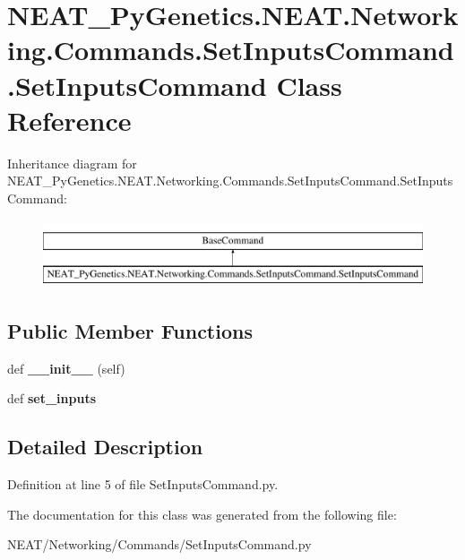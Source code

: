\hypertarget{class_n_e_a_t___py_genetics_1_1_n_e_a_t_1_1_networking_1_1_commands_1_1_set_inputs_command_1_1_set_inputs_command}{}\section{N\+E\+A\+T\+\_\+\+Py\+Genetics.\+N\+E\+A\+T.\+Networking.\+Commands.\+Set\+Inputs\+Command.\+Set\+Inputs\+Command Class Reference}
\label{class_n_e_a_t___py_genetics_1_1_n_e_a_t_1_1_networking_1_1_commands_1_1_set_inputs_command_1_1_set_inputs_command}
Inheritance diagram for N\+E\+A\+T\+\_\+\+Py\+Genetics.\+N\+E\+A\+T.\+Networking.\+Commands.\+Set\+Inputs\+Command.\+Set\+Inputs\+Command\+:\begin{figure}[H]
\begin{center}
\leavevmode
\includegraphics[height=2.000000cm]{class_n_e_a_t___py_genetics_1_1_n_e_a_t_1_1_networking_1_1_commands_1_1_set_inputs_command_1_1_set_inputs_command}
\end{center}
\end{figure}
\subsection*{Public Member Functions}
\begin{DoxyCompactItemize}
\item 
def {\bfseries \+\_\+\+\_\+init\+\_\+\+\_\+} (self)\hypertarget{class_n_e_a_t___py_genetics_1_1_n_e_a_t_1_1_networking_1_1_commands_1_1_set_inputs_command_1_1_set_inputs_command_a8976dadea27ff8c738c32b2a8c42acde}{}\label{class_n_e_a_t___py_genetics_1_1_n_e_a_t_1_1_networking_1_1_commands_1_1_set_inputs_command_1_1_set_inputs_command_a8976dadea27ff8c738c32b2a8c42acde}

\item 
def {\bfseries set\+\_\+inputs}\hypertarget{class_n_e_a_t___py_genetics_1_1_n_e_a_t_1_1_networking_1_1_commands_1_1_set_inputs_command_1_1_set_inputs_command_a610420d005c225778fa1be622cd3843a}{}\label{class_n_e_a_t___py_genetics_1_1_n_e_a_t_1_1_networking_1_1_commands_1_1_set_inputs_command_1_1_set_inputs_command_a610420d005c225778fa1be622cd3843a}

\end{DoxyCompactItemize}


\subsection{Detailed Description}


Definition at line 5 of file Set\+Inputs\+Command.\+py.



The documentation for this class was generated from the following file\+:\begin{DoxyCompactItemize}
\item 
N\+E\+A\+T/\+Networking/\+Commands/Set\+Inputs\+Command.\+py\end{DoxyCompactItemize}
